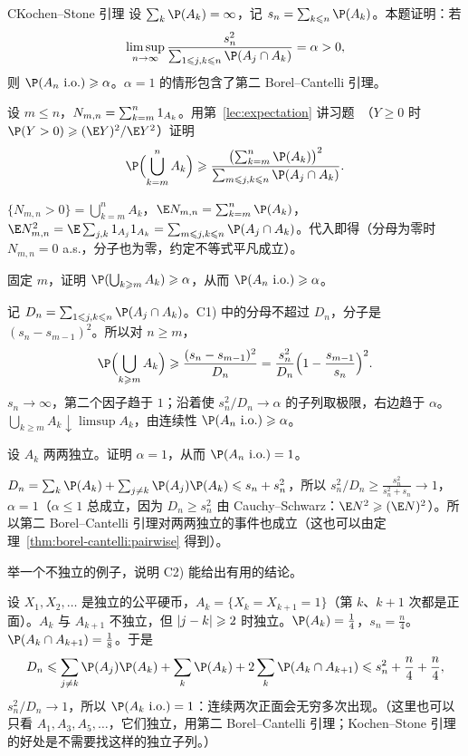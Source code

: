 \begin{probleme}{C}{Kochen--Stone 引理}
设 $\sum_k\P(A_k)=\infty$，记 $s_n=\sum_{k\leqslant n}\P(A_k)$。本题证明：若
\[
\limsup_{n\to\infty}\frac{s_n^2}{\sum_{1\leqslant j,k\leqslant n}\P(A_j\cap A_k)}=\alpha>0,
\]
则 $\P(A_n\ \text{i.o.})\geqslant\alpha$。$\alpha=1$ 的情形包含了第二 Borel--Cantelli 引理。
\begin{questions}
\item 设 $m\leqslant n$，$N_{m,n}=\sum_{k=m}^n1_{A_k}$。用第~\ref{lec:expectation} 讲习题~（$Y\geqslant0$ 时 $\P(Y>0)\geqslant(\E Y)^2/\E Y^2$）证明
\[
\P\Bigl(\bigcup_{k=m}^nA_k\Bigr)\geqslant\frac{\bigl(\sum_{k=m}^n\P(A_k)\bigr)^2}{\sum_{m\leqslant j,k\leqslant n}\P(A_j\cap A_k)} .
\]
\begin{solution}
$\{N_{m,n}>0\}=\bigcup_{k=m}^nA_k$，$\E N_{m,n}=\sum_{k=m}^n\P(A_k)$，$\E N_{m,n}^2=\E\sum_{j,k}\one_{A_j}\one_{A_k}=\sum_{m\leqslant j,k\leqslant n}\P(A_j\cap A_k)$。代入即得（分母为零时 $N_{m,n}=0$ a.s.，分子也为零，约定不等式平凡成立）。
\end{solution}
\item 固定 $m$，证明 $\P(\bigcup_{k\geqslant m}A_k)\geqslant\alpha$，从而 $\P(A_n\ \text{i.o.})\geqslant\alpha$。
\begin{solution}
记 $D_n=\sum_{1\leqslant j,k\leqslant n}\P(A_j\cap A_k)$。C1) 中的分母不超过 $D_n$，分子是 $(s_n-s_{m-1})^2$。所以对 $n\geqslant m$，
\[
\P\Bigl(\bigcup_{k\geqslant m}A_k\Bigr)\geqslant\frac{(s_n-s_{m-1})^2}{D_n}=\frac{s_n^2}{D_n}\Bigl(1-\frac{s_{m-1}}{s_n}\Bigr)^2 .
\]
$s_n\to\infty$，第二个因子趋于 $1$；沿着使 $s_n^2/D_n\to\alpha$ 的子列取极限，右边趋于 $\alpha$。$\bigcup_{k\geqslant m}A_k\downarrow\limsup A_k$，由连续性 $\P(A_n\ \text{i.o.})\geqslant\alpha$。
\end{solution}
\item 设 $A_k$ 两两独立。证明 $\alpha=1$，从而 $\P(A_n\ \text{i.o.})=1$。
\begin{solution}
$D_n=\sum_k\P(A_k)+\sum_{j\neq k}\P(A_j)\P(A_k)\leqslant s_n+s_n^2$，所以 $s_n^2/D_n\geqslant\frac{s_n^2}{s_n^2+s_n}\to1$，$\alpha=1$（$\alpha\leqslant1$ 总成立，因为 $D_n\geqslant s_n^2$ 由 Cauchy--Schwarz：$\E N^2\geqslant(\E N)^2$）。所以第二 Borel--Cantelli 引理对两两独立的事件也成立（这也可以由定理~\ref{thm:borel-cantelli:pairwise} 得到）。
\end{solution}
\item 举一个不独立的例子，说明 C2) 能给出有用的结论。
\begin{solution}
设 $X_1,X_2,\dots$ 是独立的公平硬币，$A_k=\{X_k=X_{k+1}=1\}$（第 $k$、$k+1$ 次都是正面）。$A_k$ 与 $A_{k+1}$ 不独立，但 $\lvert j-k\rvert\geqslant2$ 时独立。$\P(A_k)=\frac14$，$s_n=\frac n4$。$\P(A_k\cap A_{k+1})=\frac18$。于是
\[
D_n\leqslant\sum_{j\neq k}\P(A_j)\P(A_k)+\sum_k\P(A_k)+2\sum_k\P(A_k\cap A_{k+1})\leqslant s_n^2+\frac n4+\frac n4,
\]
$s_n^2/D_n\to1$，所以 $\P(A_k\ \text{i.o.})=1$：连续两次正面会无穷多次出现。（这里也可以只看 $A_1,A_3,A_5,\dots$，它们独立，用第二 Borel--Cantelli 引理；Kochen--Stone 引理的好处是不需要找这样的独立子列。）
\end{solution}
\end{questions}
\end{probleme}

